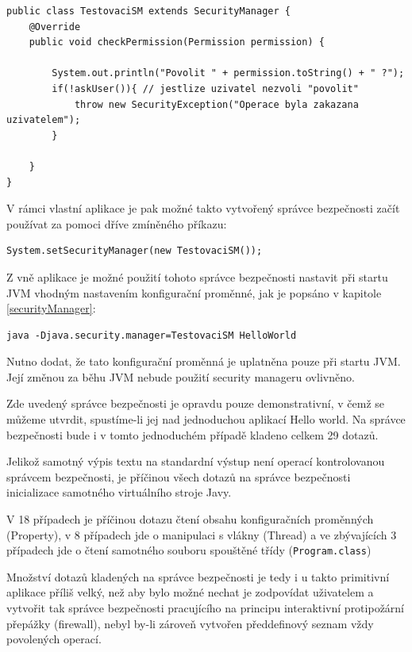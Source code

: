 \begin{lstlisting}[caption=Jednoduchý správce bezpečnosti, label=TestovaciSM]
public class TestovaciSM extends SecurityManager {
	@Override
	public void checkPermission(Permission permission) {
		
		System.out.println("Povolit " + permission.toString() + " ?");
		if(!askUser()){ // jestlize uzivatel nezvoli "povolit"
			throw new SecurityException("Operace byla zakazana uzivatelem");
		}
		
	}
}
\end{lstlisting}

V rámci vlastní aplikace je pak možné takto vytvořený správce bezpečnosti začít používat za pomoci dříve zmíněného příkazu:

\begin{lstlisting}[caption=Nastavení správce bezpečnosti zevnitř JVM, label=setSM]
System.setSecurityManager(new TestovaciSM());
\end{lstlisting}

Z vně aplikace je možné použití tohoto správce bezpečnosti nastavit při startu JVM vhodným nastavením konfigurační proměnné, jak je popsáno v kapitole \ref{securityManager}:

\begin{lstlisting}[caption=Spuštění aplikace se správcem bezpečnosti, label=runWithSM]
java -Djava.security.manager=TestovaciSM HelloWorld
\end{lstlisting}

Nutno dodat, že tato konfigurační proměnná je uplatněna pouze při startu JVM. Její změnou za běhu JVM nebude použití security manageru ovlivněno.

Zde uvedený správce bezpečnosti je opravdu pouze demonstrativní, v čemž se můžeme utvrdit, spustíme-li jej nad jednoduchou aplikací Hello world. Na správce bezpečnosti bude i v tomto jednoduchém případě kladeno celkem 29 dotazů.

Jelikož samotný výpis textu na standardní výstup není operací kontrolovanou správcem bezpečnosti, je příčinou všech dotazů na správce bezpečnosti inicializace samotného virtuálního stroje Javy.

V 18 případech je příčinou dotazu čtení obsahu konfiguračních proměnných (Property), v 8 případech jde o manipulaci s vlákny (Thread) a ve zbývajících 3 případech jde o čtení samotného souboru spouštěné třídy ({\tt Program.class})

Množství dotazů kladených na správce bezpečnosti je tedy i u takto primitivní aplikace příliš velký, než aby bylo možné nechat je zodpovídat uživatelem a vytvořit tak správce bezpečnosti pracujícího na principu interaktivní protipožární přepážky (firewall), nebyl by-li zároveň vytvořen předdefinový seznam vždy povolených operací.

